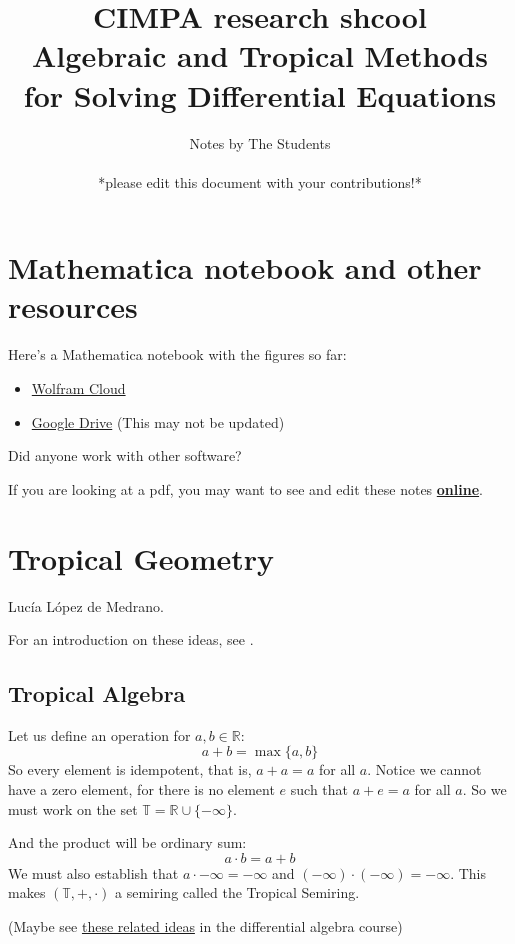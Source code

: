 \documentclass{article}
\title{CIMPA research shcool \\Algebraic and Tropical Methods for Solving Differential Equations}
\author{Notes by The Students\\\leavevmode\\
*please edit this document with your contributions!*}
\theoremstyle{definition}
\newcommand{\R}{\mathbb{R}}
\newcommand{\T}{\mathbb{T}}
\begin{document}
\maketitle
\tableofcontents\newpage
\section*{Mathematica notebook and other resources}
Here's a Mathematica notebook with the figures so far:
\begin{itemize}
    \item \href{https://www.wolframcloud.com/obj/dangcasanova/CIMPA%20oax.nb}{Wolfram Cloud}
    \item \href{https://drive.google.com/file/d/1icfYhowiRHvrhzl-_5-3-KDWNOZKMFbk/view?usp=sharing}{Google Drive} (This may not be updated)
\end{itemize}
Did anyone work with other software?\par
If you are looking at a pdf, you may want to see and edit these notes  \textbf{\href{https://www.overleaf.com/4563364175tskkrgggdqcw}{online}}.\newpage
\section{Tropical Geometry}
\label{tropgeom}

Lucía López de Medrano.\par 
For an introduction on these ideas, see \cite{brugallé2014bit}.
\subsection{Tropical Algebra}
Let us define an operation for $a,b\in\R$:
\begin{equation*}
	a+b=\max\{a,b\}
\end{equation*}
So every element is idempotent, that is, $a+a=a$ for all $a$. Notice we cannot have a zero element, for there is no element $e$ such that $a+e=a$ for all $a$. So we must work on the set $\T=\R\cup\{-\infty\}$.\par
And the product will be ordinary sum:
\begin{equation*}
	a\cdot b=a+b
\end{equation*}
We must also establish that $a\cdot -\infty=-\infty$ and $(-\infty)\cdot(-\infty)=-\infty$. This makes $(\T,+,\cdot)$ a semiring called the Tropical Semiring.\par
(Maybe see \hyperref[difalgtrop]{these related ideas} in the differential algebra course)
\end{document}
